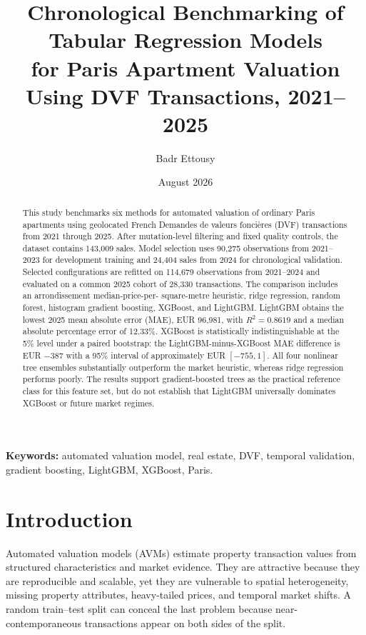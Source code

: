 \documentclass[11pt,a4paper]{article}
\title{Chronological Benchmarking of Tabular Regression Models\\
for Paris Apartment Valuation Using DVF Transactions, 2021--2025}
\author{Badr Ettousy}
\date{August 2026}
\begin{document}
\maketitle

\begin{abstract}
This study benchmarks six methods for automated valuation of ordinary Paris
apartments using geolocated French Demandes de valeurs fonci\`eres (DVF)
transactions from 2021 through 2025. After mutation-level filtering and fixed
quality controls, the dataset contains 143,009 sales. Model selection uses
90,275 observations from 2021--2023 for development training and 24,404 sales
from 2024 for chronological validation. Selected configurations are refitted on
114,679 observations from 2021--2024 and evaluated on a common 2025 cohort of
28,330 transactions. The comparison includes an arrondissement median-price-per-
square-metre heuristic, ridge regression, random forest, histogram gradient
boosting, XGBoost, and LightGBM. LightGBM obtains the lowest 2025 mean absolute
error (MAE), EUR 96,981, with $R^2=0.8619$ and a median absolute percentage error
of 12.33\%. XGBoost is statistically indistinguishable at the 5\% level under a
paired bootstrap: the LightGBM-minus-XGBoost MAE difference is EUR $-387$ with a
95\% interval of approximately EUR $[-755,1]$. All four nonlinear tree ensembles
substantially outperform the market heuristic, whereas ridge regression performs
poorly. The results support gradient-boosted trees as the practical reference
class for this feature set, but do not establish that LightGBM universally
dominates XGBoost or future market regimes.
\end{abstract}

\textbf{Keywords:} automated valuation model, real estate, DVF, temporal
validation, gradient boosting, LightGBM, XGBoost, Paris.

\section{Introduction}

Automated valuation models (AVMs) estimate property transaction values from
structured characteristics and market evidence. They are attractive because
they are reproducible and scalable, yet they are vulnerable to spatial
heterogeneity, missing property attributes, heavy-tailed prices, and temporal
market shifts. A random train--test split can conceal the last problem because
near-contemporaneous transactions appear on both sides of the split.
\end{document}
